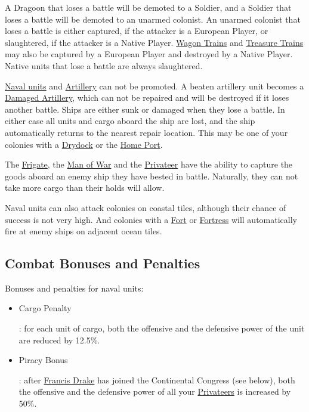 \documentclass[12pt]{book}
\begin{document}
A Dragoon that loses a battle will be demoted to a Soldier, and a
Soldier that loses a battle will be demoted to an unarmed colonist. An
unarmed colonist that loses a battle is either captured, if the
attacker is a European Player, or slaughtered, if the attacker is a
Native Player. \hyperlink{Wagon Train}{Wagon Trains} and
\hyperlink{Treasure Train}{Treasure Trains} may also be captured by a
European Player and destroyed by a Native Player. Native units that
lose a battle are always slaughtered.

\hyperlink{Naval Units}{Naval units} and
\hyperlink{Artillery}{Artillery} can not be promoted. A beaten
artillery unit becomes a \hyperlink{Damaged Artillery}{Damaged
Artillery}, which can not be repaired and will be destroyed if it
loses another battle. Ships are either sunk or damaged when they lose
a battle. In either case all units and cargo aboard the ship are lost,
and the ship automatically returns to the nearest repair
location. This may be one of your colonies with a
\hyperlink{Drydock}{Drydock} or the \hyperlink{Home Port}{Home Port}.

The \hyperlink{Frigate}{Frigate}, the \hyperlink{Man of War}{Man of
War} and the \hyperlink{Privateer}{Privateer} have the ability to
capture the goods aboard an enemy ship they have bested in
battle. Naturally, they can not take more cargo than their holds will
allow.

Naval units can also attack colonies on coastal tiles, although their
chance of success is not very high. And colonies with a
\hyperlink{Fort}{Fort} or \hyperlink{Fortress}{Fortress} will
automatically fire at enemy ships on adjacent ocean tiles.


\hypertarget{combat bonuses}{\subsection{Combat Bonuses and Penalties}}

Bonuses and penalties for naval units:

\begin{itemize}
\item \hypertarget{Cargo Penalty}{Cargo Penalty}: for each unit of
  cargo, both the offensive and the defensive power of the unit are
  reduced by 12.5\%.
\item \hypertarget{Piracy Bonus}{Piracy Bonus}: after
  \hyperlink{Francis Drake}{Francis Drake} has joined the Continental
  Congress (see below), both the offensive and the defensive power of
  all your \hyperlink{Privateer}{Privateers} is increased by 50\%.
\end{itemize}
\end{document}
